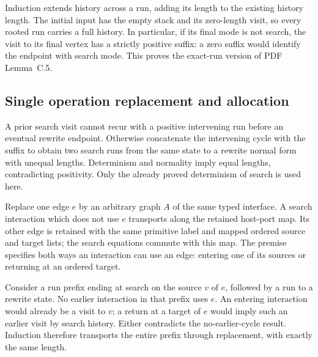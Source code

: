 Induction extends history across a run, adding its length to the existing
history length. The initial input has the empty stack and its zero-length
visit, so every rooted run carries a full history. In particular, if its final
mode is not search, the visit to its final vertex has a strictly positive
suffix: a zero suffix would identify the endpoint with search mode. This
proves the exact-run version of PDF Lemma~C.5.




\subsection{Single operation replacement and allocation}

A prior search visit cannot recur with a positive intervening run before an
eventual rewrite endpoint. Otherwise concatenate the intervening cycle with
the suffix to obtain two search runs from the same state to a rewrite normal
form with unequal lengths. Determinism and normality imply equal lengths,
contradicting positivity. Only the already proved determinism of search is
used here.


Replace one edge $e$ by an arbitrary graph $A$ of the same typed interface.
A search interaction which does not use $e$ transports along the retained
host-port map. Its other edge is retained with the same primitive label and
mapped ordered source and target lists; the search equations commute with
this map. The premise specifies both ways an interaction can use an edge:
entering one of its sources or returning at an ordered target.


Consider a run prefix ending at search on the source $v$ of $e$, followed
by a run to a rewrite state. No earlier interaction in that prefix uses $e$.
An entering interaction would already be a visit to $v$; a return at a target
of $e$ would imply such an earlier visit by search history. Either contradicts
the no-earlier-cycle result. Induction therefore transports the entire prefix
through replacement, with exactly the same length.

